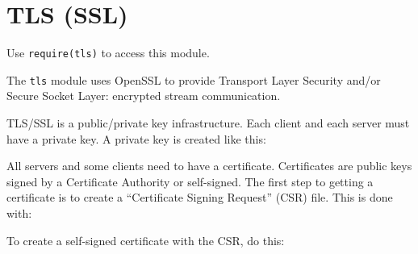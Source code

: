 \section{TLS (SSL)}\label{tls-ssl}

\begin{Shaded}
\begin{Highlighting}[]
 
\end{Highlighting}
\end{Shaded}

Use \texttt{require(\textquotesingle{}tls\textquotesingle{})} to access
this module.

The \texttt{tls} module uses OpenSSL to provide Transport Layer Security
and/or Secure Socket Layer: encrypted stream communication.

TLS/SSL is a public/private key infrastructure. Each client and each
server must have a private key. A private key is created like this:

\begin{Shaded}
\begin{Highlighting}[]
 
\end{Highlighting}
\end{Shaded}

All servers and some clients need to have a certificate. Certificates
are public keys signed by a Certificate Authority or self-signed. The
first step to getting a certificate is to create a ``Certificate Signing
Request'' (CSR) file. This is done with:

\begin{Shaded}
\begin{Highlighting}[]
  
\end{Highlighting}
\end{Shaded}

To create a self-signed certificate with the CSR, do this:

\begin{Shaded}
\begin{Highlighting}[]
   
\end{Highlighting}
\end{Shaded}

